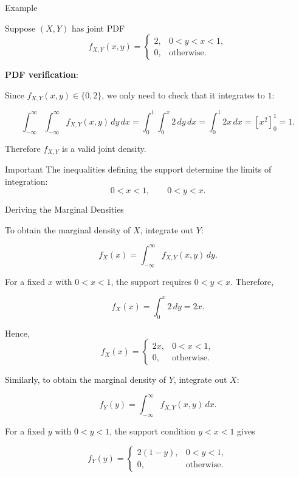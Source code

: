 \begin{frame}{Example}

Suppose $(X,Y)$ has joint PDF
$$
f_{X,Y}(x,y)
=
\begin{cases}
2, & 0<y<x<1,\\
0, & \text{otherwise}.
\end{cases}
$$
 

\textbf{PDF verification}:

Since $f_{X,Y}(x,y) \in \{ 0,2 \}$,
we only need to check that it integrates to $1$:

 
\begin{equation}
\int_{-\infty}^{\infty}
\int_{-\infty}^{\infty}
f_{X,Y}(x,y)\,dy\,dx
=
\int_0^1\int_0^x 2\,dy\,dx
=
\int_0^1 2x\,dx
=
\left[x^2\right]_0^1
=1.
\end{equation}
 

Therefore $f_{X,Y}$ is a valid joint density.

\begin{keybox}{Important}
The inequalities defining the support determine the limits of integration:
$$
0<x<1,
\qquad
0<y<x.
$$
\end{keybox}

\end{frame}


\begin{frame}{Deriving the Marginal Densities}

To obtain the marginal density of $X$, integrate out $Y$:

$$
f_X(x)
=
\int_{-\infty}^{\infty}
f_{X,Y}(x,y)\,dy.
$$

For a fixed $x$ with $0<x<1$, the support requires $0<y<x.$ Therefore,
 
\begin{equation}
f_X(x)
=
\int_0^x 2\,dy = 2x.
\end{equation}
 

Hence,
$$
{
f_X(x)
=
\begin{cases}
2x, & 0<x<1,\\
0, & \text{otherwise}.
\end{cases}
}
$$

Similarly, to obtain the marginal density of $Y$, integrate out $X$:

$$
f_Y(y)
=
\int_{-\infty}^{\infty}
f_{X,Y}(x,y)\,dx.
$$

For a fixed $y$ with $0<y<1$, the support condition $y<x<1$ gives

$$
{
f_Y(y)
=
\begin{cases}
2(1-y), & 0<y<1,\\
0, & \text{otherwise}.
\end{cases}
}
$$
\end{frame}


